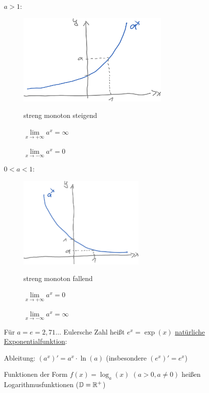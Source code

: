 \ul{$a>1$}:
\begin{figure}[h!]
	\begin{minipage}{0.48\linewidth}
		\centering\includegraphics[height=4.5cm]{Bilder/188}
		\caption{}
	\end{minipage}
	\begin{minipage}{0.30\linewidth}
		streng monoton steigend
		
		$\lim\limits_{x\to+\infty}a^x=\infty$
		
		$\lim\limits_{x\to-\infty}a^x=0$
	\end{minipage}
\end{figure}

\ul{$0<a<1$}:
\begin{figure}[h!]
	\begin{minipage}{0.48\linewidth}
		\centering\includegraphics[height=4.5cm]{Bilder/189}
		\caption{}
	\end{minipage}
	\begin{minipage}{0.30\linewidth}
		streng monoton fallend
		
		$\lim\limits_{x\to+\infty}a^x=0$
		
		$\lim\limits_{x\to-\infty}a^x=\infty$
	\end{minipage}
\end{figure}

\clearpage
Für $a=e=2{,}71\ldots$ Eulersche Zahl heißt $e^x=\exp(x)$ \ul{natürliche Exponentialfunktion}:

Ableitung: $(a^x)'=a^x\cdot\ln(a)$ (insbesondere $(e^x)'=e^x$)

\Def Funktionen der Form $f(x)=\log_a(x)$ $(a>0,a\ne0)$ heißen Logarithmusfunktionen ($\mathbb{D}=\mathbb{R}^+$)

